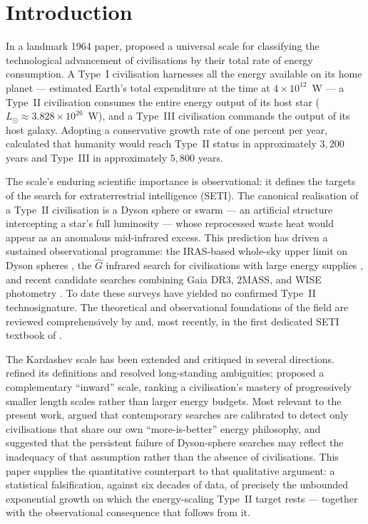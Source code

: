 
\section{Introduction}
\label{sec:intro}

In a landmark 1964 paper, \citet{Kardashev1964} proposed a universal scale for
classifying the technological advancement of civilisations by their total rate of
energy consumption. A Type~I civilisation harnesses all the energy available on its
home planet --- \citet{Kardashev1964} estimated Earth's total expenditure at the time
at $4\times10^{12}$~W --- a Type~II civilisation consumes the entire energy output of
its host star ($L_\odot \approx 3.828\times10^{26}$~W), and a Type~III civilisation
commands the output of its host galaxy. Adopting a conservative growth rate of one
percent per year, \citet{Kardashev1964} calculated that humanity would reach Type~II
status in approximately $3{,}200$ years and Type~III in approximately $5{,}800$ years.

The scale's enduring scientific importance is observational: it defines the targets of
the search for extraterrestrial intelligence (SETI). The canonical realisation of a
Type~II civilisation is a Dyson sphere or swarm --- an artificial structure
intercepting a star's full luminosity \citep{Dyson1960} --- whose reprocessed waste
heat would appear as an anomalous mid-infrared excess. This prediction has driven a
sustained observational programme: the IRAS-based whole-sky upper limit on Dyson
spheres \citep{Carrigan2009}, the $\hat{G}$ infrared search for civilisations with
large energy supplies \citep{Wright2014}, and recent candidate searches combining
Gaia DR3, 2MASS, and WISE photometry \citep{Suazo2024}. To date these surveys have
yielded no confirmed Type~II technosignature. The theoretical and observational
foundations of the field are reviewed comprehensively by \citet{LingamLoeb2021} and,
most recently, in the first dedicated SETI textbook of \citet{Wright2026}.

The Kardashev scale has been extended and critiqued in several directions.
\citet{Gray2020} refined its definitions and resolved long-standing ambiguities;
\citet{Barrow1998} proposed a complementary ``inward'' scale, ranking a civilisation's
mastery of progressively smaller length scales rather than larger energy budgets. Most
relevant to the present work, \citet{Ivanov2020} argued that contemporary searches are
calibrated to detect only civilisations that share our own ``more-is-better'' energy
philosophy, and suggested that the persistent failure of Dyson-sphere searches may
reflect the inadequacy of that assumption rather than the absence of civilisations.
This paper supplies the quantitative counterpart to that qualitative argument: a
statistical falsification, against six decades of data, of precisely the unbounded
exponential growth on which the energy-scaling Type~II target rests --- together with
the observational consequence that follows from it.


